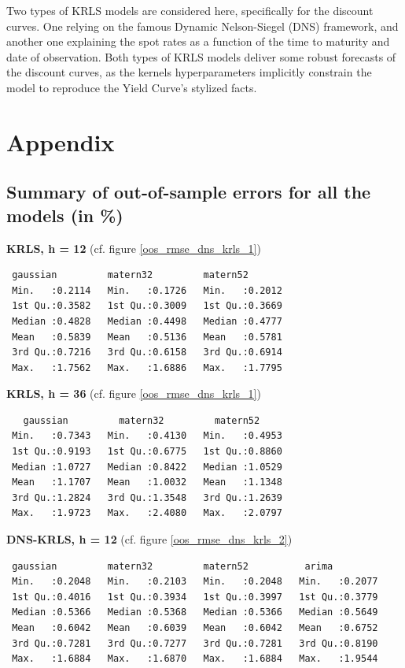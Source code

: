 \begin{table}[!htb]
Two types of KRLS models are considered here, specifically for the discount curves. One relying on the famous Dynamic Nelson-Siegel (DNS) framework, and another one explaining the spot rates as a function of the time to maturity and date of observation. Both types of KRLS models deliver some robust forecasts of the discount curves, as the kernels hyperparameters implicitly constrain the model to reproduce the Yield Curve's stylized facts. 

\newpage

\section{Appendix}

\subsection{Summary of out-of-sample errors for all the models (in \%)}
\label{appendix_oos_rmse}

\textbf{KRLS, h = 12} (cf. figure \ref{oos_rmse_dns_krls_1})

\begin{verbatim}
 gaussian         matern32         matern52     
 Min.   :0.2114   Min.   :0.1726   Min.   :0.2012  
 1st Qu.:0.3582   1st Qu.:0.3009   1st Qu.:0.3669  
 Median :0.4828   Median :0.4498   Median :0.4777  
 Mean   :0.5839   Mean   :0.5136   Mean   :0.5781  
 3rd Qu.:0.7216   3rd Qu.:0.6158   3rd Qu.:0.6914  
 Max.   :1.7562   Max.   :1.6886   Max.   :1.7795  
\end{verbatim}

\textbf{KRLS, h = 36} (cf. figure \ref{oos_rmse_dns_krls_1}) 

\begin{verbatim}
   gaussian         matern32         matern52     
 Min.   :0.7343   Min.   :0.4130   Min.   :0.4953  
 1st Qu.:0.9193   1st Qu.:0.6775   1st Qu.:0.8860  
 Median :1.0727   Median :0.8422   Median :1.0529  
 Mean   :1.1707   Mean   :1.0032   Mean   :1.1348  
 3rd Qu.:1.2824   3rd Qu.:1.3548   3rd Qu.:1.2639  
 Max.   :1.9723   Max.   :2.4080   Max.   :2.0797 
\end{verbatim}

\textbf{DNS-KRLS, h = 12} (cf. figure \ref{oos_rmse_dns_krls_2})

\begin{verbatim}
 gaussian         matern32         matern52          arima       
 Min.   :0.2048   Min.   :0.2103   Min.   :0.2048   Min.   :0.2077  
 1st Qu.:0.4016   1st Qu.:0.3934   1st Qu.:0.3997   1st Qu.:0.3779  
 Median :0.5366   Median :0.5368   Median :0.5366   Median :0.5649  
 Mean   :0.6042   Mean   :0.6039   Mean   :0.6042   Mean   :0.6752  
 3rd Qu.:0.7281   3rd Qu.:0.7277   3rd Qu.:0.7281   3rd Qu.:0.8190  
 Max.   :1.6884   Max.   :1.6870   Max.   :1.6884   Max.   :1.9544 
\end{verbatim}


\end{table}
